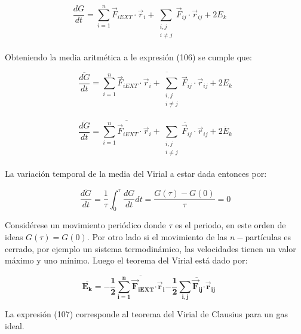 \documentclass[]{article}
\begin{document}
\[\frac{dG}{dt} = \sum_{i = 1}^{n}{{\overrightarrow{F}}_{iEXT} \cdot}{\overrightarrow{r}}_{i} + \sum_{\begin{matrix}
i,j \\
i \neq j \\
\end{matrix}}^{}{\overrightarrow{F}}_{ij} \cdot {\overrightarrow{r}}_{ij} + {2E}_{k}\ \ \ \ \ \ \]

Obteniendo la media aritmética a le expresión (106) se cumple que:

\[\overline{\frac{dG}{dt}} = \overline{\sum_{i = 1}^{n}{{\overrightarrow{F}}_{iEXT} \cdot}{\overrightarrow{r}}_{i} + \sum_{\begin{matrix}
i,j \\
i \neq j \\
\end{matrix}}^{}{\overrightarrow{F}}_{ij} \cdot {\overrightarrow{r}}_{ij} + {2E}_{k}}\]

\[\overline{\frac{dG}{dt}} = \overline{\sum_{i = 1}^{n}{{\overrightarrow{F}}_{iEXT} \cdot}{\overrightarrow{r}}_{i}} + \overline{\sum_{\begin{matrix}
i,j \\
i \neq j \\
\end{matrix}}^{}{\overrightarrow{F}}_{ij} \cdot {\overrightarrow{r}}_{ij}} + \overline{{2E}_{k}}\]

La variación temporal de la media del Virial a estar dada entonces por:

\[\overline{\frac{dG}{dt}} = \frac{1}{\tau}\int_{0}^{\tau}\frac{dG}{dt}dt = \frac{G(\tau) - G(0)}{\tau} = 0\]

Considérese un movimiento periódico donde \(\tau\) es el periodo, en
este orden de ideas \(G(\tau) = G(0)\). Por otro lado si el movimiento
de las \(n -\)partículas es cerrado, por ejemplo un sistema
termodinámico, las velocidades tienen un valor máximo y uno mínimo.
Luego el teorema del Virial está dado por:

\[\overline{\mathbf{E}_{\mathbf{k}}}\mathbf{= -}\frac{\mathbf{1}}{\mathbf{2}}\overline{\sum_{\mathbf{i = 1}}^{\mathbf{n}}{{\overrightarrow{\mathbf{F}}}_{\mathbf{iEXT}}\mathbf{\cdot}}{\overrightarrow{\mathbf{r}}}_{\mathbf{i}}}\mathbf{-}\frac{\mathbf{1}}{\mathbf{2}}\overline{\sum_{\mathbf{i,j}}^{}{\overrightarrow{\mathbf{F}}}_{\mathbf{ij}}\mathbf{\cdot}{\overrightarrow{\mathbf{r}}}_{\mathbf{ij}}}\mathbf{\ \ \ \ \ \ \ }\]

La expresión (107) corresponde al teorema del Virial de Clausius para un
gas ideal.
\end{document}
